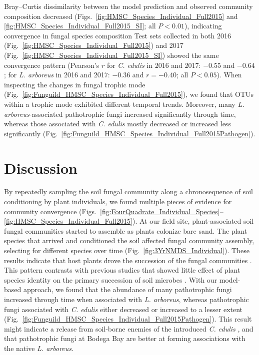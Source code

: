 Bray--Curtis dissimilarity between the model prediction and observed community composition decreased (Figs.~\ref{fig:HMSC_Species_Individual_Full2015} and \ref{fig:HMSC_Species_Individual_Full2015_SI}; all $P<0.01$), indicating convergence in fungal species composition
Test sets collected in both 2016 (Fig.~\ref{fig:HMSC_Species_Individual_Full2015}) and 2017 (Fig.~\ref{fig:HMSC_Species_Individual_Full2015_SI}) showed the same convergence pattern (Pearson's $r$ for \textit{C. edulis} in 2016 and 2017: $-0.55$ and $-0.64$; for \textit{L. arboreus} in 2016 and 2017: $-0.36$ and $r=-0.40$; all $P < 0.05$). 
When inspecting the changes in fungal trophic mode (Fig.~\ref{fig:Funguild_HMSC_Species_Individual_Full2015}), we found that OTUs within a trophic mode exhibited different temporal trends. Moreover, many \textit{L. arboreus}-associated pathotrophic fungi increased significantly through time, whereas those associated with \textit{C. edulis} mostly decreased or increased less significantly (Fig.~\ref{fig:Funguild_HMSC_Species_Individual_Full2015Pathogen}).
\par



\section{Discussion}
By repeatedly sampling the soil fungal community along a chronosequence of soil conditioning by plant individuals, we found multiple pieces of evidence for community convergence (Figs.~\ref{fig:FourQuadrate_Individual_Species}--\ref{fig:HMSC_Species_Individual_Full2015}).
At our field site, plant-associated soil fungal communities started to assemble as plants colonize bare sand. 
The plant species that arrived and conditioned the soil affected fungal community assembly, selecting for different species over time (Fig.~\ref{fig:3YrNMDS_Individual}). 
These results indicate that host plants drove the succession of the fungal communities \citep{RoyBolduc2016, Scheublin2004}. This pattern contrasts with previous studies that showed little effect of plant species identity on the primary succession of soil microbes \citep{BrownJumpponen2014, Sikes2014}.
With our model-based approach, we found that the abundance of many pathotrophic fungi increased through time when associated with \textit{L. arboreus}, whereas pathotrophic fungi associated with \textit{C. edulis} either decreased or increased to a lesser extent (Fig.~\ref{fig:Funguild_HMSC_Species_Individual_Full2015Pathogen}).
This result might indicate a release from soil-borne enemies of the introduced \textit{C. edulis} \citep{Keane2002, Callaway2004}, and that pathotrophic fungi at Bodega Bay are better at forming associations with the native \textit{L. arboreus}.
\par


